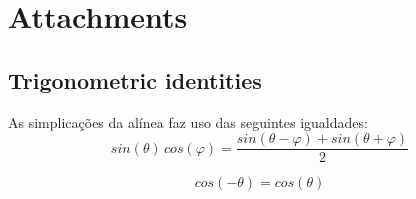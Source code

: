 \documentclass[a4paper]{article}
\begin{document}
\clearpage
\section{Attachments}
\subsection{Trigonometric identities}
\label{subsec:trigident}
\noindent As simplicações da alínea \emph{} faz uso das seguintes igualdades:
\begin{equation}
	sin(\theta) \, cos(\varphi) = \frac{sin(\theta - \varphi) + sin(\theta + \varphi)}{2}
\end{equation}

\begin{equation}
	cos(-\theta) = cos(\theta)
\end{equation}
\end{document}
